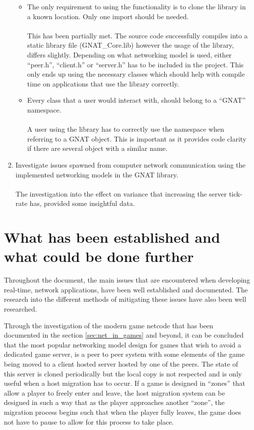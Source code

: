 \begin{enumerate}
\begin{itemize}
  \item The only requirement to using the functionality is to clone the library in a known location. Only one import should be needed.
    \\\\
    This has been partially met. The source code successfully compiles into a static library file (GNAT\_Core.lib) however the usage of the library, differs slightly. Depending on what networking model is used, either ``peer.h'', ``client.h'' or ``server.h'' has to be included in the project. This only ends up using the necessary classes which should help with compile time on applications that use the library correctly.


  \item Every class that a user would interact with, should belong to a ``GNAT'' namespace.
    \\\\
    A user using the library has to correctly use the namespace when referring to a GNAT object. This is important as it provides code clarity if there are several object with a similar name.
\end{itemize}


\item Investigate issues spawned from computer network communication using the implemented networking models in the GNAT library.
  \\\\
  The investigation into the effect on variance that increasing the server tick-rate has, provided some insightful data.
\end{enumerate}


\section{What has been established and what could be done further}
Throughout the document, the main issues that are encountered when developing real-time, network applications, have been well established and documented. The research into the different methods of mitigating these issues have also been well researched.

Through the investigation of the modern game netcode that has been documented in the section \ref{sec:net_in_games} and beyond, it can be concluded that the most popular networking model design for games that wish to avoid a dedicated game server, is a peer to peer system with some elements of the game being moved to a client hosted server hosted by one of the peers. The state of this server is cloned periodically but the local copy is not respected and is only useful when a host migration has to occur. If a game is designed in ``zones'' that allow a player to freely enter and leave, the host migration system can be designed in such a way that as the player approaches another ``zone'', the migration process begins such that when the player fully leaves, the game does not have to pause to allow for this process to take place.

